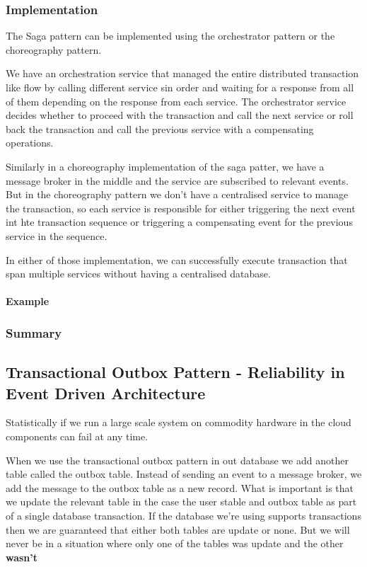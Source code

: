 \subsubsection{Implementation}
The Saga pattern can be implemented using the orchestrator pattern or the choreography pattern.

We have an orchestration service that managed the entire distributed transaction like flow by calling different service sin order and waiting for a response from all of them depending on the response from each service.
The orchestrator service decides whether to proceed with the transaction and call the next service or roll back the transaction and call the previous service with a compensating operations.

Similarly in a choreography implementation of the saga patter, we have a message broker in the middle and the service are subscribed to relevant events.
But in the choreography pattern we don't have a centralised service to manage the transaction, so each service is responsible for either triggering the next event int hte transaction sequence or triggering a compensating event for the previous service in the sequence.

In either of those implementation, we can successfully execute transaction that span multiple services without having a centralised database.

\paragraph{Example}

\subsubsection{Summary}

\subsection{Transactional Outbox Pattern - Reliability in Event Driven Architecture}
Statistically if we run a large scale system on commodity hardware in the cloud components can fail at any time.

When we use the transactional outbox pattern in out database we add another table called the outbox table.
Instead of sending an event to a message broker, we add the message to the outbox table as a new record.
What is important is that we update the relevant table in the case the user stable and outbox table as part of a single database transaction.
If the database we're using supports transactions then we are guaranteed that either both tables are update or none.
But we will never be in a situation where only one of the tables was update and the other \textbf{wasn't}

